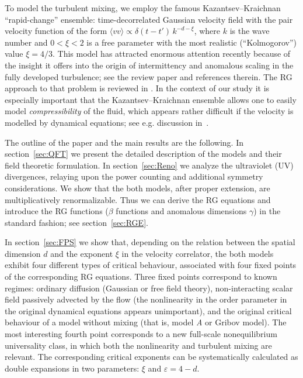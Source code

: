 \documentclass[12pt]{article}
\begin{document}
To model the turbulent mixing, we employ the famous Kazantsev--Kraichnan
``rapid-change'' ensemble: time-decorrelated Gaussian velocity field
with the pair velocity function of the form
$\langle vv\rangle \propto \delta(t-t') \, k^{-d-\xi}$, where
$k$ is the wave number and $0<\xi<2$ is a free parameter with the most
realistic (``Kolmogorov'') value $\xi=4/3$.
This model has attracted enormous attention recently because of the insight
it offers into the origin of intermittency and anomalous scaling in the
fully developed turbulence; see the review paper \cite{FGV} and references
therein. The RG approach to that problem is reviewed in \cite{JphysA}.
In the context of our study it is especially important that the
Kazantsev--Kraichnan ensemble allows one to easily model
{\it compressibility} of the fluid, which appears rather difficult
if the velocity is modelled by dynamical equations; see e.g.
discussion in~\cite{Compress}.


The outline of the paper and the main results are the following.
In section~\ref{sec:QFT} we present the detailed description of the models
and their field theoretic formulation.
In section~\ref{sec:Reno} we analyze the ultraviolet (UV) divergences,
relaying upon the power counting and additional symmetry considerations.
We show that the both models, after proper extension,
are multiplicatively renormalizable. Thus we can derive the RG equations
and introduce the RG functions ($\beta$ functions and anomalous dimensions
$\gamma$) in the standard fashion; see section~\ref{sec:RGE}.

In section~\ref{sec:FPS} we show that, depending on the relation between
the spatial dimension $d$ and the exponent $\xi$ in
the velocity correlator, the both models exhibit four different types of
critical behaviour, associated with four fixed points of the corresponding
RG equations. Three fixed points correspond to known regimes:
ordinary diffusion (Gaussian or free field theory), non-interacting
scalar field passively advected by the flow (the nonlinearity in the order
parameter in the original dynamical equations appears unimportant),
and the original critical behaviour of a model without mixing (that is,
model {\it A} or Gribov model). The most interesting fourth point corresponds
to a new full-scale nonequilibrium universality class, in which both
the nonlinearity and turbulent mixing are relevant. The corresponding
critical exponents can be systematically calculated as double expansions
in two parameters: $\xi$ and $\varepsilon=4-d$.
\end{document}
